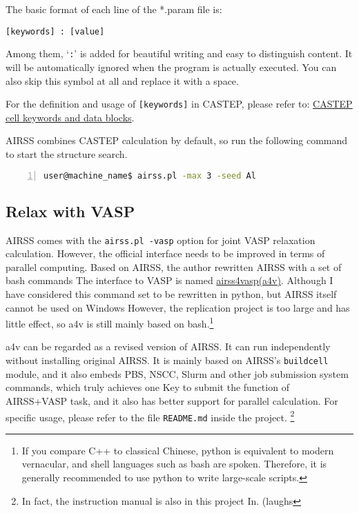\documentclass[a4paper, 10pt]{article}
\begin{document}
The basic format of each line of the *.param file is:
\begin{lstlisting}
[keywords] : [value]
\end{lstlisting}
Among them, `\verb|:|' is added for beautiful writing and easy to distinguish content. It will be automatically ignored when the program is actually executed. You can also skip this symbol at all and replace it with a space.

For the definition and usage of \verb|[keywords]| in CASTEP, please refer to: \href{http://www.tcm.phy.cam.ac.uk/castep/documentation/WebHelp/content/modules/castep/keywords/k_main_structure.htm}{CASTEP cell keywords and data blocks}.

AIRSS combines CASTEP calculation by default, so run the following command to start the structure search.
\begin{lstlisting}[language={bash},numbers=left]
user@machine_name$ airss.pl -max 3 -seed Al
\end{lstlisting}

\subsection{Relax with VASP}
AIRSS comes with the \verb|airss.pl -vasp| option for joint VASP relaxation calculation. However, the official interface needs to be improved in terms of parallel computing. Based on AIRSS, the author rewritten AIRSS with a set of bash commands The interface to VASP is named \href{https://github.com/kYangLi/airss4vasp}{airss4vasp(a4v)}. Although I have considered this command set to be rewritten in python, but AIRSS itself cannot be used on Windows However, the replication project is too large and has little effect, so a4v is still mainly based on bash.\footnote{If you compare C++ to classical Chinese, python is equivalent to modern vernacular, and shell languages such as bash are spoken. Therefore, it is generally recommended to use python to write large-scale scripts.}

a4v can be regarded as a revised version of AIRSS. It can run independently without installing original AIRSS. It is mainly based on AIRSS's \verb|buildcell| module, and it also embeds PBS, NSCC, Slurm and other job submission system commands, which truly achieves one Key to submit the function of AIRSS+VASP task, and it also has better support for parallel calculation. For specific usage, please refer to the file \verb|README.md| inside the project. \footnote{In fact, the instruction manual is also in this project In. (laughs}
\end{document}
